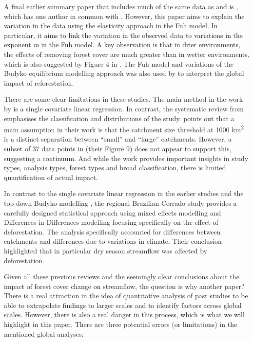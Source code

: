 \documentclass[]{elsarticle} %
\begin{document}
A final earlier summary paper that includes much of the same data as \citet{zhang2017} and \citet{filoso2017} is \citet{zhou2015}, which has one author in common with \citet{zhang2017}. However, this paper aims to explain the variation in the data using the elasticity approach in the Fuh model. In particular, it aims to link the variation in the observed data to variations in the exponent \emph{m} in the Fuh model. A key observation is that in drier environments, the effects of removing forest cover are much greater than in wetter environments, which is also suggested by Figure 4 in \citet{zhang2017}. The Fuh model and variations of the Budyko equilibrium modelling approach was also used by \citet{hoekvandijke2002} to interpret the global impact of reforestation.

There are some clear limitations in these studies. The main method in the work by \citet{zhang2017} is a single covariate linear regression. In contrast, the systematic review from \citet{filoso2017} emphasises the classification and distributions of the study. \citet{zhang2017} points out that a main assumption in their work is that the catchment size threshold at 1000 km\textsuperscript{2} is a distinct separation between ``small'' and ``large'' catchments. However, a subset of 37 data points in \citet{filoso2017} (their Figure 9) does not appear to support this, suggesting a continuum. And while the work \citet{filoso2017} provides important insights in study types, analysis types, forest types and broad classification, there is limited quantification of actual impact.

In contrast to the single covariate linear regression in the earlier studies \citep{zhang2017, filoso2017} and the top-down Budyko modelling \citep{zhou2015, hoekvandijke2022}, the regional Brazilian Cerrado study \citep{levy2018} provides a carefully designed statistical approach using mixed effects modelling and Differences-in-Differences modelling focusing specifically on the effect of deforestation. The analysis specifically accounted for differences between catchments and differences due to variations in climate. Their conclusion highlighted that in particular dry season streamflow was affected by deforestation.

Given all these previous reviews and the seemingly clear conclusions about the impact of forest cover change on streamflow, the question is why another paper?
There is a real attraction in the idea of quantitative analysis of past studies to be able to extrapolate findings to larger scales and to identify factors across global scales.
However, there is also a real danger in this process, which is what we will highlight in this paper. There are three potential errors (or limitations) in the mentioned global analyses:
\end{document}
